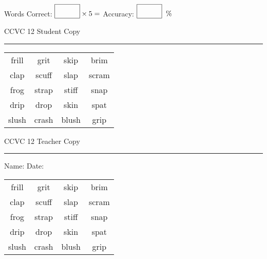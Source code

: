 \documentclass{memoir}
\begin{document}
\normalsize

Words Correct: $\fbox{\phantom{\huge 100}} \times 5 = $ Accuracy: $\fbox{\phantom{\huge 100}}\;\; \%$ 

\vfill

\newpage


\footnotesize \noindent
CCVC 12 \hfill Student Copy
\smallskip
\hrule

\Large

\setlength{\tabcolsep}{14pt}
\def\arraystretch{3}

{\selectfont


\begin{vplace}[0.5]
\begin{center}
\begin{tabular}{cccc}
frill & grit      & skip & brim      \\
clap             & scuff & slap            & scram \\
frog & strap & stiff & snap \\
drip & drop & skin & spat            \\
slush & crash & blush & grip      \\
\end{tabular}
\end{center}
\end{vplace}

}

\newpage

\footnotesize \noindent
CCVC 12 \hfill Teacher Copy
\smallskip
\hrule

\normalsize

\vfill

\noindent
Name: \underline{\hspace{1.75in}} \hfill Date: \underline{\hspace{1in}}

\Large

{\selectfont


\begin{vplace}[0.5]
\begin{center}
\begin{tabular}{cccc}
frill & grit      & skip & brim      \\
clap             & scuff & slap            & scram \\
frog & strap & stiff & snap \\
drip & drop & skin & spat            \\
slush & crash & blush & grip      \\
\end{tabular}
\end{center}
\end{vplace}



}
\end{document}
